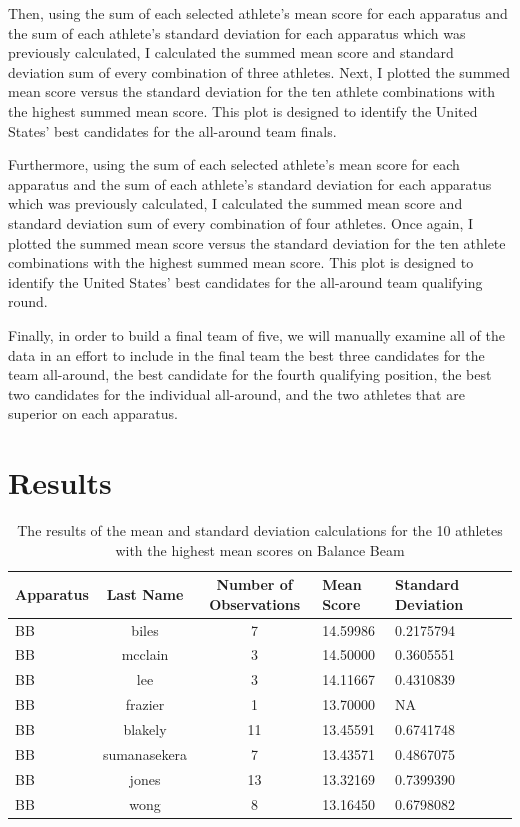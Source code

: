 \documentclass[12pt]{article}
\begin{document}
Then, using the sum of each selected athlete's mean score for each apparatus and the sum of each athlete's standard 
deviation for each apparatus which was previously calculated, I calculated the summed mean score and standard deviation sum 
of every combination of three athletes. Next, I plotted the summed mean score versus the standard deviation for the ten 
athlete combinations with the highest summed mean score. This plot is designed to identify the United States' best 
candidates for the all-around team finals.

Furthermore, using the sum of each selected athlete's mean score for each apparatus and the sum of each athlete's standard 
deviation for each apparatus which was previously calculated, I calculated the summed mean score and standard deviation sum 
of every combination of four athletes. Once again, I plotted the summed mean score versus the standard deviation for the ten 
athlete combinations with the highest summed mean score. This plot is designed to identify the United States' best 
candidates for the all-around team qualifying round.

Finally, in order to build a final team of five, we will manually examine all of the data in an effort to include in 
the final team the best three candidates for the team all-around, the best candidate for the fourth qualifying position, 
the best two candidates for the individual all-around, and the two athletes that are superior on each apparatus.


\section{Results}
\label{sec:res}

\begin{table}[tbp]
  \caption{The results of the mean and standard deviation calculations for the 10 athletes with the highest 
  mean scores on Balance Beam}
  \label{tab:tableBB}
\centering
\begin{tabular}[t]{lccllll}
  \toprule
  Apparatus & Last Name & Number of Observations & Mean Score & Standard Deviation\\
  \midrule
  BB & biles & 7 & 14.59986 & 0.2175794\\
  \midrule
  BB & mcclain & 3 & 14.50000 & 0.3605551\\
  \midrule
  BB & lee & 3 & 14.11667 & 0.4310839\\
  \midrule
  BB & frazier & 1 & 13.70000 & NA\\
  \midrule
  BB & blakely & 11 & 13.45591 & 0.6741748\\
  \midrule
  BB & sumanasekera & 7 & 13.43571 & 0.4867075\\
  \midrule
  BB & jones & 13 & 13.32169 & 0.7399390\\
  \midrule
  BB & wong & 8 & 13.16450 & 0.6798082\\
  \bottomrule
  \end{tabular}
  \end{table}
\end{document}
